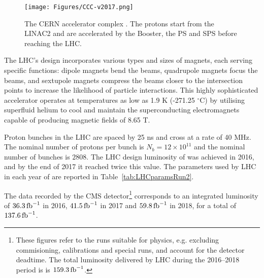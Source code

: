 \begin{figure}[htb]
\begin{center}
\texttt{[image: Figures/CCC-v2017.png]}
\end{center}
\caption{The CERN accelerator complex \cite{OPEN-PHO-ACCEL-2016-009}. The protons start from the LINAC2 and are accelerated by the Booster, the PS and SPS before reaching the LHC.}
\label{fig:CERNaccelerators}
\end{figure}

The LHC's design incorporates various types and sizes of magnets, each serving specific functions: dipole magnets bend the beams, quadrupole magnets focus the beams, and sextupole magnets compress the beams closer to the intersection points to increase the likelihood of particle interactions.
This highly sophisticated accelerator operates at temperatures as low as 1.9 K (-271.25 $^\circ$C) by utilising superfluid helium to cool and maintain the superconducting electromagnets capable of producing magnetic fields of 8.65 T.

Proton bunches in the LHC are spaced by 25 ns and cross at a rate of 40 MHz.
The nominal number of protons per bunch is $N_b = 12 \times 10^{11}$ and the nominal number of bunches is $2808$.
The LHC design luminosity of \LHigh was achieved in 2016, and by the end of 2017 it reached twice this value.
The parameters used by LHC in each year of \RunII{} are reported in Table~\ref{tab:LHCparamsRun2}.

The data recorded by the CMS detector\footnote{
These figures refer to the runs suitable for physics, e.g. excluding commisioning, calibrations and special runs, and account for the detector deadtime.
The total luminosity delivered by LHC during the 2016--2018 period is is $159.3\mbox{\ensuremath{\,\text{fb}^{-1}}}$.}
corresponds to an integrated luminosity of $36.3\mbox{\ensuremath{\,\text{fb}^{-1}}}$ in 2016, $41.5\mbox{\ensuremath{\,\text{fb}^{-1}}}$ in 2017 and $59.8\mbox{\ensuremath{\,\text{fb}^{-1}}}$ in 2018,
for a total of $137.6\mbox{\ensuremath{\,\text{fb}^{-1}}}$.

